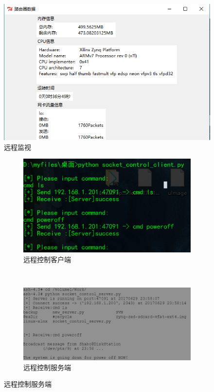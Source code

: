 \documentclass{itecreport-zh}
\begin{document}
\begin{figure}[!h]
\centering
\includegraphics[width=.8\textwidth]{zynqinfo.png}
\caption{远程监视}
\end{figure}

\begin{figure}[!h]
\centering
  \begin{subfigure}[b]{0.5\textwidth}
  \includegraphics[width=\textwidth]{zynqctrl1.png}
  \caption{远程控制客户端}
  \end{subfigure}
  ~
  \begin{subfigure}[b]{0.4\textwidth}
  \includegraphics[width=\textwidth]{zynqctrl2.png}
  \caption{远程控制服务端}
  \end{subfigure}
\end{figure}
\end{document}
